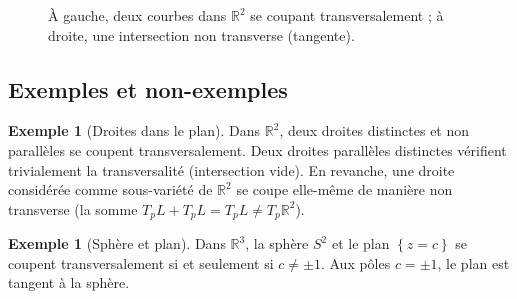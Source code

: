 \documentclass[12pt,a4paper,openany]{book}
\theoremstyle{definition}
\newtheorem{exemple}[definition]{Exemple}
\theoremstyle{plain}
\theoremstyle{remark}
\newcommand{\R}{\mathbb{R}}
\newcommand{\set}[1]{\left\{#1\right\}}
\begin{document}
\begin{figure}[ht]
\centering
{}
\caption{À gauche, deux courbes dans $\R^2$ se coupant transversalement ;
  à droite, une intersection non transverse (tangente).}
\label{fig:transverse-vs-non}
\end{figure}

\subsection{Exemples et non-exemples}\label{subsec:exemples-transversalite}

\begin{exemple}[Droites dans le plan]\label{ex:droites-plan}%
Dans $\R^2$, deux droites distinctes et non parallèles se coupent
transversalement. Deux droites parallèles distinctes vérifient trivialement
la transversalité (intersection vide). En revanche, une droite considérée
comme sous-variété de $\R^2$ se coupe elle-même de manière non transverse
(la somme $T_p L + T_p L = T_p L \neq T_p \R^2$).
\end{exemple}

\begin{exemple}[Sphère et plan]\label{ex:sphere-plan}
Dans $\R^3$, la sphère $S^2$ et le plan $\set{z = c}$ se coupent
transversalement si et seulement si $c \neq \pm 1$. Aux pôles $c = \pm 1$,
le plan est tangent à la sphère.
\end{exemple}
\end{document}
